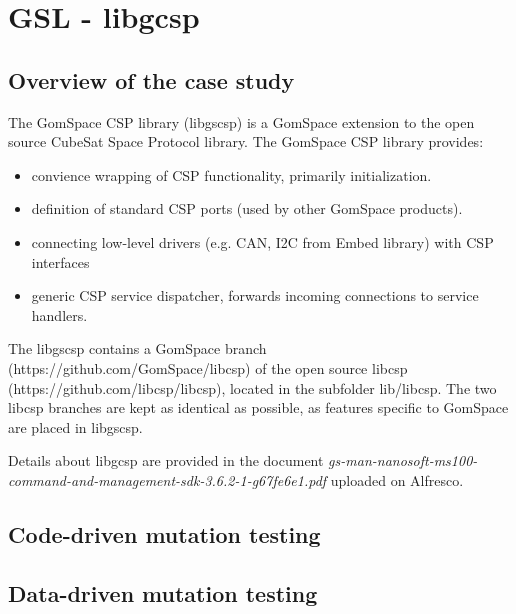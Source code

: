 

\section{GSL - libgcsp}
\label{sec:caseStudies:GSL:libgcsp}

\subsection{Overview of the case study}

The GomSpace CSP library (libgscsp) is a GomSpace extension to the open source CubeSat Space Protocol library.
The GomSpace CSP library provides:
\begin{itemize}
\item convience wrapping of CSP functionality, primarily initialization.
\item  definition of standard CSP ports (used by other GomSpace products).
\item connecting low-level drivers (e.g. CAN, I2C from Embed library) with CSP interfaces 
\item generic CSP service dispatcher, forwards incoming connections to service handlers.
\end{itemize}

The libgscsp contains a GomSpace branch (https://github.com/GomSpace/libcsp) of the open source libcsp (https://github.com/libcsp/libcsp), located in the subfolder lib/libcsp. The two libcsp branches are kept as identical as possible, as features specific to GomSpace are placed in libgscsp.

Details about libgcsp are provided in the document \emph{gs-man-nanosoft-ms100-command-and-management-sdk-3.6.2-1-g67fe6e1.pdf} uploaded on Alfresco.



\subsection{Code-driven mutation testing}




\subsection{Data-driven mutation testing}


